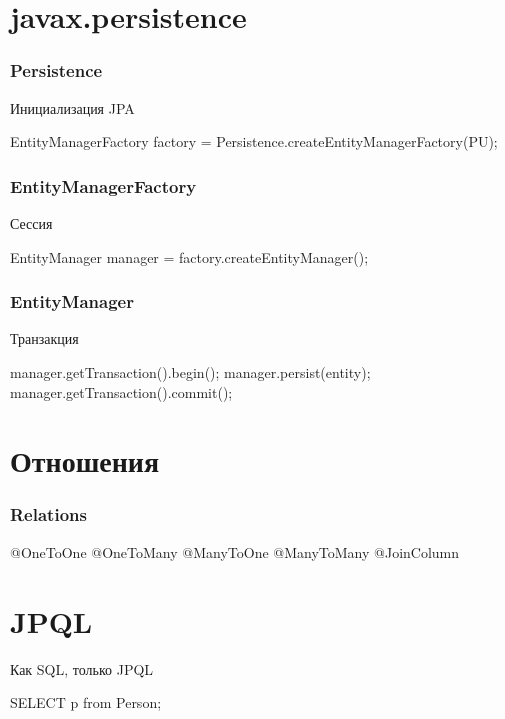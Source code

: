 \documentclass[russian,aspectratio=169,14pt]{beamer}
\begin{document}
\section*{javax.persistence}

\begin{frame}[fragile]
	\frametitle{Persistence}
	Инициализация JPA
	\vfill
	\begin{listjava}
EntityManagerFactory factory = 
        Persistence.createEntityManagerFactory(PU);
	\end{listjava}
\end{frame}

\begin{frame}[fragile]
	\frametitle{EntityManagerFactory}
	Сессия
	\vfill
	\begin{listjava}
EntityManager manager = factory.createEntityManager();
	\end{listjava}
\end{frame}

\begin{frame}[fragile]
	\frametitle{EntityManager}
	Транзакция
	\vfill
	\begin{listjava}
manager.getTransaction().begin();
manager.persist(entity);
manager.getTransaction().commit();
	\end{listjava}
\end{frame}

\section*{Отношения}

\begin{frame}[fragile]
	\frametitle{Relations}
	\begin{listjava}
@OneToOne
@OneToMany
@ManyToOne
@ManyToMany
@JoinColumn
	\end{listjava}
\end{frame}

\section*{JPQL}
\begin{frame}[fragile]
Как SQL, только JPQL
\begin{listjava}
SELECT p from Person;
\end{listjava}
\end{frame}

\questions
\end{document}

